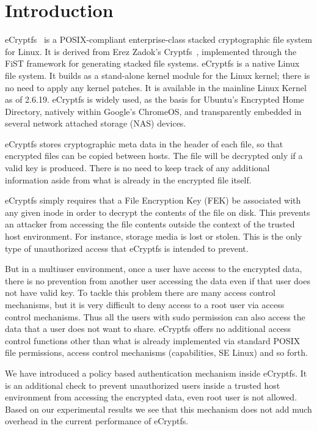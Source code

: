 \section{Introduction}
\label{intro}

eCryptfs~\cite{halcrow2007ecryptfs} is a POSIX-compliant
enterprise-class stacked cryptographic file system for Linux.  It is
derived from Erez Zadok's Cryptfs~\cite{zadok:cryptfs}, implemented
through the FiST framework for generating stacked file systems.
eCryptfs is a native Linux file system.  It builds as a stand-alone
kernel module for the Linux kernel; there is no need to apply any
kernel patches.  It is available in the mainline Linux Kernel as of
2.6.19.  eCryptfs is widely used, as the basis for Ubuntu's Encrypted
Home Directory, natively within Google's ChromeOS, and transparently
embedded in several network attached storage (NAS) devices.

eCryptfs stores cryptographic meta data in the header of each file, so
that encrypted files can be copied between hosts.  The file will be
decrypted only if a valid key is produced.  There is no need to keep
track of any additional information aside from what is already in the
encrypted file itself.

eCryptfs simply requires that a File Encryption Key (FEK) be
associated with any given inode in order to decrypt the contents of
the file on disk.  This prevents an attacker from accessing the file
contents outside the context of the trusted host environment.  For
instance, storage media is lost or stolen.  This is the only type of
unauthorized access that eCryptfs is intended to prevent.

But in a multiuser environment, once a user have access to the
encrypted data, there is no prevention from another user accessing the
data even if that user does not have valid key.  To tackle this
problem there are many access control mechanisms, but it is very
difficult to deny access to a root user via access control mechanisms.
Thus all the users with sudo permission can also access the data that
a user does not want to share.  eCryptfs offers no additional access
control functions other than what is already implemented via standard
POSIX file permissions, access control mechanisms (capabilities, SE
Linux) and so forth.

We have introduced a policy based authentication mechanism inside
eCryptfs.  It is an additional check to prevent unauthorized users
inside a trusted host environment from accessing the encrypted data,
even root user is not allowed.  Based on our experimental results we
see that this mechanism does not add much overhead in the current
performance of eCryptfs.

